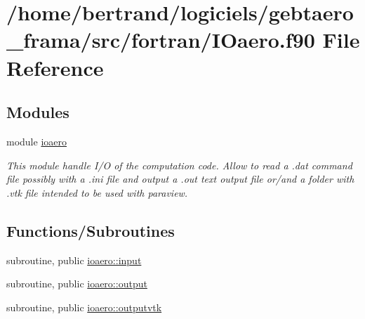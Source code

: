 \hypertarget{_i_oaero_8f90}{}\section{/home/bertrand/logiciels/gebtaero\+\_\+frama/src/fortran/\+I\+Oaero.f90 File Reference}
\label{_i_oaero_8f90}
\subsection*{Modules}
\begin{DoxyCompactItemize}
\item 
module \hyperlink{namespaceioaero}{ioaero}
\begin{DoxyCompactList}\small\item\em This module handle I/O of the computation code. Allow to read a .dat command file possibly with a .ini file and output a .out text output file or/and a folder with .vtk file intended to be used with paraview. \end{DoxyCompactList}\end{DoxyCompactItemize}
\subsection*{Functions/\+Subroutines}
\begin{DoxyCompactItemize}
\item 
subroutine, public \hyperlink{namespaceioaero_a039bc1aae10012ce8e368bc202bb81be}{ioaero\+::input}
\item 
subroutine, public \hyperlink{namespaceioaero_a1f2f8f2b4f6e233d2753c1fd1809a44a}{ioaero\+::output}
\item 
subroutine, public \hyperlink{namespaceioaero_a7eb68cb1588d24e05c8f056ca107e163}{ioaero\+::outputvtk}
\end{DoxyCompactItemize}
